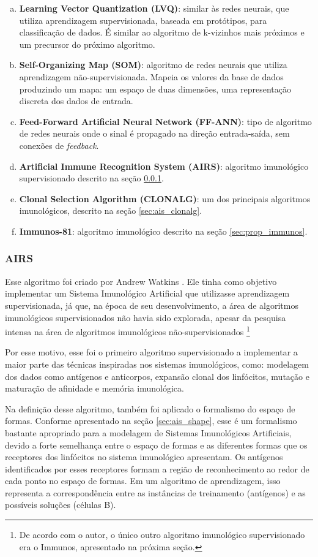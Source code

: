 \begin{enumerate}[a)]
    \item \textbf{Learning Vector Quantization (LVQ)}: similar às redes neurais, que utiliza aprendizagem supervisionada, baseada em protótipos, para classificação de dados. É similar ao algoritmo de k-vizinhos mais próximos e um precursor do próximo algoritmo.
    \item \textbf{Self-Organizing Map (SOM)}: algoritmo de redes neurais que utiliza aprendizagem não-supervisionada. Mapeia os valores da base de dados produzindo um mapa: um espaço de duas dimensões, uma representação discreta dos dados de entrada.
    \item \textbf{Feed-Forward Artificial Neural Network (FF-ANN)}: tipo de algoritmo de redes neurais onde o sinal é propagado na direção entrada-saída, sem conexões de \emph{feedback}.
    \item \textbf{Artificial Immune Recognition System (AIRS)}: algoritmo imunológico supervisionado descrito na seção \ref{sec:prop_airs}.
    \item \textbf{Clonal Selection Algorithm (CLONALG)}: um dos principais algoritmos imunológicos, descrito na seção \ref{sec:ais_clonalg}.
    \item \textbf{Immunos-81}: algoritmo imunológico descrito na seção \ref{sec:prop_immunos}.
\end{enumerate}

\subsubsection{AIRS}
\label{sec:prop_airs}

Esse algoritmo foi criado por Andrew Watkins \cite{Andrew2003}. Ele tinha como objetivo implementar um Sistema Imunológico Artificial que utilizasse aprendizagem supervisionada, já que, na época de seu desenvolvimento, a área de algoritmos imunológicos supervisionados não havia sido explorada, apesar da pesquisa intensa na área de algoritmos imunológicos não-supervisionados \footnote{De acordo com o autor, o único outro algoritmo imunológico supervisionado era o Immunos, apresentado na próxima seção.}

Por esse motivo, esse foi o primeiro algoritmo supervisionado a implementar a maior parte das técnicas inspiradas nos sistemas imunológicos, como: modelagem dos dados como antígenos e anticorpos, expansão clonal dos linfócitos, mutação e maturação de afinidade e memória imunológica.

Na definição desse algoritmo, também foi aplicado o formalismo do espaço de formas. Conforme apresentado na seção \ref{sec:ais_shape}, esse é um formalismo bastante apropriado para a modelagem de Sistemas Imunológicos Artificiais, devido a forte semelhança entre o espaço de formas e as diferentes formas que os receptores dos linfócitos no sistema imunológico apresentam. Os antígenos identificados por esses receptores formam a região de reconhecimento ao redor de cada ponto no espaço de formas. Em um algoritmo de aprendizagem, isso representa a correspondência entre as instâncias de treinamento (antígenos) e as possíveis soluções (células B).

